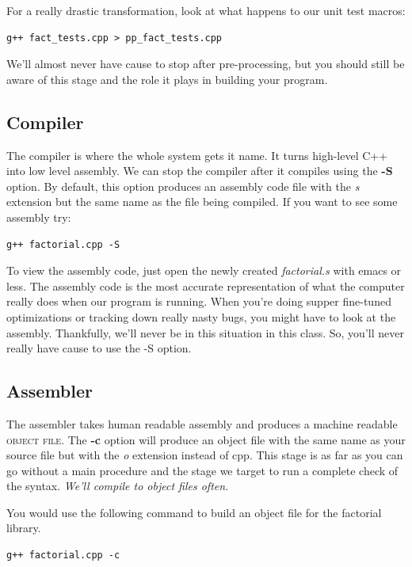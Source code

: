 \documentclass[]{tufte-handout}
\begin{document}
For a really drastic transformation, look at what happens to our unit test macros:
\begin{verbatim}
g++ fact_tests.cpp > pp_fact_tests.cpp
\end{verbatim}

We'll almost never have cause to stop after pre-processing, but you should still be aware of this stage and the role it plays in building your program. 

\subsection{Compiler}

The compiler is where the whole system gets it name.  It turns high-level C++ into low level assembly.  We can stop the compiler after it compiles using the \textbf{-S} option. By default, this option produces an assembly code file with the \textit{s} extension but the same name as the file being compiled. If you want to see some assembly try:
\begin{verbatim}
g++ factorial.cpp -S
\end{verbatim}
To view the assembly code, just open the newly created \textit{factorial.s} with emacs or less. The assembly code is the most accurate representation of what the computer really does when our program is running.  When you're doing supper fine-tuned optimizations or tracking down really nasty bugs, you might have to look at the assembly.  Thankfully, we'll never be in this situation in this class. So, you'll never really have cause to use the -S option.  

\subsection{Assembler}

The assembler takes human readable assembly and produces a machine readable \textsc{object file}.   The \textbf{-c} option will produce an object file with the same name as your source file but with the \textit{o} extension instead of cpp.  This stage is as far as you can go without a main procedure and the stage we target to run a complete check of the syntax. \textit{We'll compile to object files often.}  

You would use the following command to build an object file for the factorial library.
\begin{verbatim}
g++ factorial.cpp -c
\end{verbatim}
\end{document}
